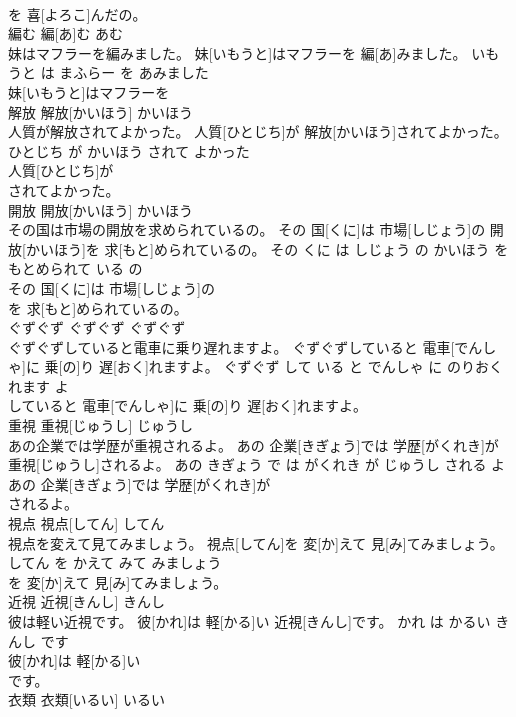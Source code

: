 \documentclass[8pt]{extreport}
\begin{document}
\begin{CJK}{UTF8}{min}
\\	を 喜[よろこ]んだの。			
\\	編む	編[あ]む	あむ	
\\	妹はマフラーを編みました。	妹[いもうと]はマフラーを 編[あ]みました。	いもうと は まふらー を あみました	
\\	妹[いもうと]はマフラーを
\\	解放	解放[かいほう]	かいほう	
\\	人質が解放されてよかった。	人質[ひとじち]が 解放[かいほう]されてよかった。	ひとじち が かいほう されて よかった	
\\	人質[ひとじち]が
\\	されてよかった。			
\\	開放	開放[かいほう]	かいほう	
\\	その国は市場の開放を求められているの。	その 国[くに]は 市場[しじょう]の 開放[かいほう]を 求[もと]められているの。	その くに は しじょう の かいほう を もとめられて いる の	
\\	その 国[くに]は 市場[しじょう]の
\\	を 求[もと]められているの。			
\\	ぐずぐず	ぐずぐず	ぐずぐず	
\\	ぐずぐずしていると電車に乗り遅れますよ。	ぐずぐずしていると 電車[でんしゃ]に 乗[の]り 遅[おく]れますよ。	ぐずぐず して いる と でんしゃ に のりおくれます よ	
\\	していると 電車[でんしゃ]に 乗[の]り 遅[おく]れますよ。			
\\	重視	重視[じゅうし]	じゅうし	
\\	あの企業では学歴が重視されるよ。	あの 企業[きぎょう]では 学歴[がくれき]が 重視[じゅうし]されるよ。	あの きぎょう で は がくれき が じゅうし される よ	
\\	あの 企業[きぎょう]では 学歴[がくれき]が
\\	されるよ。			
\\	視点	視点[してん]	してん	
\\	視点を変えて見てみましょう。	視点[してん]を 変[か]えて 見[み]てみましょう。	してん を かえて みて みましょう	
\\	を 変[か]えて 見[み]てみましょう。			
\\	近視	近視[きんし]	きんし	
\\	彼は軽い近視です。	彼[かれ]は 軽[かる]い 近視[きんし]です。	かれ は かるい きんし です	
\\	彼[かれ]は 軽[かる]い
\\	です。			
\\	衣類	衣類[いるい]	いるい	

\end{CJK}
\end{document}
